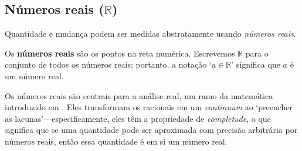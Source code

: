 \subsection*{Números reais ($\mathbb{R}$)}

Quantidade e mudança podem ser medidas abstratamente usando \textit{números reais}.

\begin{definition}
\label{defRealsInformal}
Os \textbf{números reais} são os pontos na reta numérica. Escrevemos $\mathbb{R}$  para o conjunto de todos os números reais; portanto, a notação `$a \in \mathbb{R}$' significa que $a$ é um número real.

\end{definition}

Os números reais são centrais para a análise real, um ramo da matemática introduzido em . Eles transformam os racionais em um \textit{continuum} ao `preencher as lacunas'---especificamente, eles têm a propriedade de \textit{completude}, o que significa que se uma quantidade pode ser aproximada com precisão arbitrária por números reais, então essa quantidade é em si um número real.


